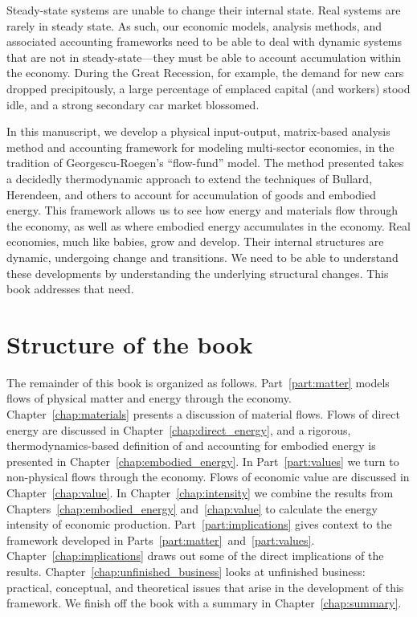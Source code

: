 Steady-state systems are unable to change
their internal state.
Real systems are rarely in steady state.
As such, our economic models, analysis methods,
and associated accounting frameworks
need to be able to deal with dynamic systems
that are not in steady-state---they must
be able to account accumulation within the economy.
During the Great Recession, for example, the demand
for new cars dropped precipitously,
a large percentage of emplaced
capital (and workers) stood idle, and 
a strong secondary car market blossomed. 

In this manuscript, we develop a physical input-output, 
matrix-based analysis method and accounting framework for 
modeling multi-sector economies, 
in the tradition of Georgescu-Roegen's ``flow-fund'' 
model.\cite{G-R1979a, G-R1979b} 
The method presented takes a decidedly thermodynamic approach
to extend the techniques of Bullard, Herendeen, and others 
to account for accumulation of goods
and embodied energy. 
This framework allows us to see how energy 
and materials flow through the economy, 
as well as where embodied energy accumulates in the economy.
Real economies, 
much like babies,
grow and develop.
Their internal structures are dynamic,
undergoing change and transitions.
We need to be able to understand these developments
by understanding the underlying structural changes. 
This book
addresses that need.

\section{Structure of the book}
\label{sec:structure}

The remainder of this book is organized as follows. 
Part~\ref{part:matter} models flows of physical matter and energy
through the economy.
Chapter~\ref{chap:materials} presents a discussion of material flows.
Flows of direct energy are discussed in Chapter~\ref{chap:direct_energy}, 
and a rigorous, thermodynamics-based definition of and accounting for 
embodied energy is presented in Chapter~\ref{chap:embodied_energy}.
In Part~\ref{part:values} we turn to non-physical flows through the economy. 
Flows of economic value are discussed in Chapter~\ref{chap:value}.
In Chapter~\ref{chap:intensity} we combine the results from 
Chapters~\ref{chap:embodied_energy} and~\ref{chap:value} to
calculate the energy intensity of economic production.
Part~\ref{part:implications} gives context to the framework developed in
Parts~\ref{part:matter}~and~\ref{part:values}.
Chapter~\ref{chap:implications} draws out some of the direct implications
of the results.
Chapter~\ref{chap:unfinished_business} looks at 
unfinished business: practical, conceptual, and theoretical issues
that arise in the development of this framework.
We finish off the book with a summary in Chapter~\ref{chap:summary}.

